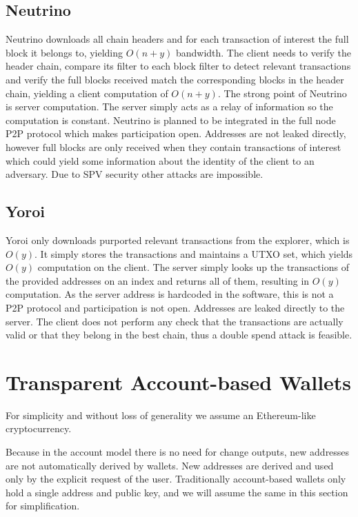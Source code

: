 \documentclass[sigconf]{acmart}
\begin{document}
\subsection{Neutrino}
Neutrino downloads all chain headers and for each transaction of interest the full block it belongs to, yielding $O(n+y)$ bandwidth. The client needs to verify the header chain, compare its filter to each block filter to detect relevant transactions and verify the full blocks received match the corresponding blocks in the header chain, yielding a client computation of $O(n+y)$. The strong point of Neutrino is server computation. The server simply acts as a relay of information so the computation is constant. Neutrino is planned to be integrated in the full node P2P protocol which makes participation open. Addresses are not leaked directly, however full blocks are only received when they contain transactions of interest which could yield some information about the identity of the client to an adversary. Due to SPV security other attacks are impossible.

\subsection{Yoroi}
Yoroi only downloads purported relevant transactions from the explorer, which is $O(y)$. It simply stores the transactions and maintains a UTXO set, which yields $O(y)$ computation on the client. The server simply looks up the transactions of the provided addresses on an index and returns all of them, resulting in $O(y)$ computation. As the server address is hardcoded in the software, this is not a P2P protocol and participation is not open. Addresses are leaked directly to the server. The client does not perform any check that the transactions are actually valid or that they belong in the best chain, thus a double spend attack is feasible.

\section{Transparent Account-based Wallets}

For simplicity and without loss of generality we assume an Ethereum-like cryptocurrency.

Because in the account model there is no need for change outputs, new addresses are not automatically derived by wallets. New addresses are derived and used only by the explicit request of the user. Traditionally account-based wallets only hold a single address and public key, and we will assume the same in this section for simplification.
\end{document}
